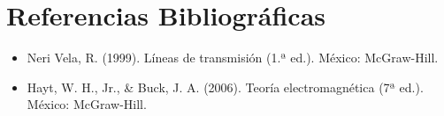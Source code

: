 \section{Referencias Bibliográficas}

\begin{itemize}
    \item Neri Vela, R. (1999). Líneas de transmisión (1.ª ed.). México: McGraw-Hill.

    \item Hayt, W. H., Jr., \& Buck, J. A. (2006). Teoría electromagnética (7ª ed.). México: McGraw-Hill.
\end{itemize}

\pagebreak